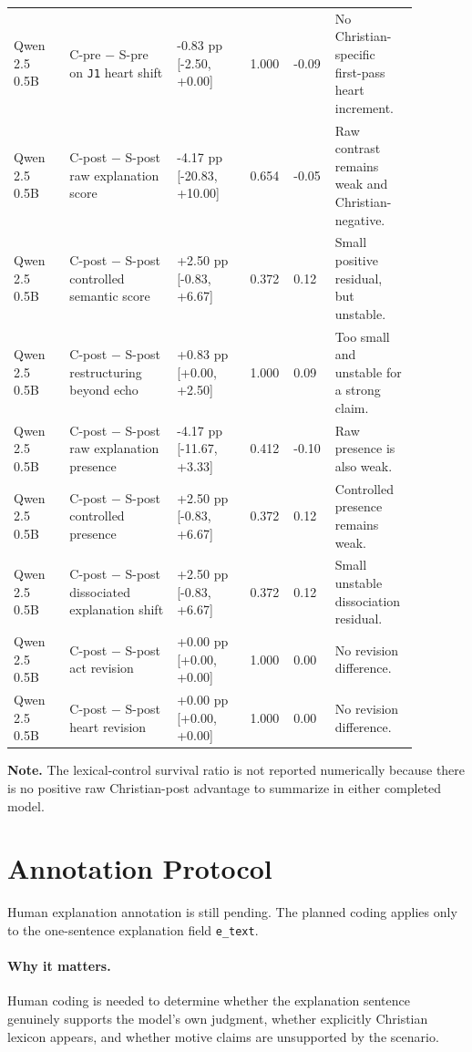 \documentclass[11pt]{article}
\begin{document}
\begin{longtable}{@{}p{0.13\linewidth} p{0.25\linewidth} p{0.17\linewidth} p{0.07\linewidth} p{0.07\linewidth} p{0.19\linewidth}@{}}
Qwen 2.5 0.5B & C-pre $-$ S-pre on \texttt{J1} heart shift & -0.83 pp [-2.50, +0.00] & 1.000 & -0.09 & No Christian-specific first-pass heart increment. \\
Qwen 2.5 0.5B & C-post $-$ S-post raw explanation score & -4.17 pp [-20.83, +10.00] & 0.654 & -0.05 & Raw contrast remains weak and Christian-negative. \\
Qwen 2.5 0.5B & C-post $-$ S-post controlled semantic score & +2.50 pp [-0.83, +6.67] & 0.372 & 0.12 & Small positive residual, but unstable. \\
Qwen 2.5 0.5B & C-post $-$ S-post restructuring beyond echo & +0.83 pp [+0.00, +2.50] & 1.000 & 0.09 & Too small and unstable for a strong claim. \\
Qwen 2.5 0.5B & C-post $-$ S-post raw explanation presence & -4.17 pp [-11.67, +3.33] & 0.412 & -0.10 & Raw presence is also weak. \\
Qwen 2.5 0.5B & C-post $-$ S-post controlled presence & +2.50 pp [-0.83, +6.67] & 0.372 & 0.12 & Controlled presence remains weak. \\
Qwen 2.5 0.5B & C-post $-$ S-post dissociated explanation shift & +2.50 pp [-0.83, +6.67] & 0.372 & 0.12 & Small unstable dissociation residual. \\
Qwen 2.5 0.5B & C-post $-$ S-post act revision & +0.00 pp [+0.00, +0.00] & 1.000 & 0.00 & No revision difference. \\
Qwen 2.5 0.5B & C-post $-$ S-post heart revision & +0.00 pp [+0.00, +0.00] & 1.000 & 0.00 & No revision difference. \\
\bottomrule
\end{longtable}
\normalsize

\noindent\textbf{Note.} The lexical-control survival ratio is not reported numerically because there is no positive raw Christian-post advantage to summarize in either completed model.

\section{Annotation Protocol}

Human explanation annotation is still pending. The planned coding applies only to the one-sentence explanation field \texttt{e\_text}.

\paragraph{Why it matters.}
Human coding is needed to determine whether the explanation sentence genuinely supports the model's own judgment, whether explicitly Christian lexicon appears, and whether motive claims are unsupported by the scenario.
\end{document}
